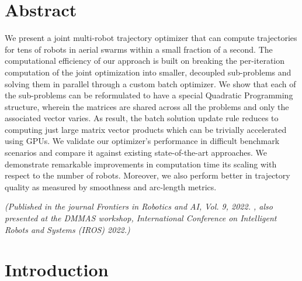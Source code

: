 \section{\label{sec:abstract}Abstract}

\noindent We present a joint multi-robot trajectory optimizer that can compute trajectories for tens of robots in aerial swarms within a small fraction of a second. The computational efficiency of our approach is built on breaking the per-iteration computation of the joint optimization into smaller, decoupled sub-problems and solving them in parallel through a custom batch optimizer. We show that each of the sub-problems can be reformulated to have a special Quadratic Programming structure, wherein the matrices are shared across all the problems and only the associated vector varies. As result, the batch solution update rule reduces to computing just large matrix vector products which can be trivially accelerated using GPUs. We validate our optimizer's performance in difficult benchmark scenarios and compare it against existing state-of-the-art approaches. We demonstrate remarkable improvements in computation time its scaling with respect to the number of robots. Moreover, we also perform better in trajectory quality as measured by smoothness and arc-length metrics.

{\small \textit{(Published in the journal Frontiers in Robotics and AI, Vol. 9, 2022.  \cite{self-gpu-mat}, also presented at the DMMAS workshop, International Conference on Intelligent Robots and Systems (IROS) 2022.)}}    


\section{Introduction}

